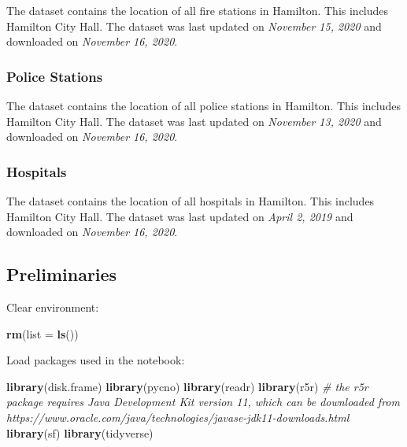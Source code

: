 \documentclass[
]{article}
\newenvironment{Shaded}{\begin{snugshade}}{\end{snugshade}}
\newcommand{\CommentTok}[1]{\textcolor[rgb]{0.56,0.35,0.01}{\textit{#1}}}
\newcommand{\DataTypeTok}[1]{\textcolor[rgb]{0.13,0.29,0.53}{#1}}
\newcommand{\KeywordTok}[1]{\textcolor[rgb]{0.13,0.29,0.53}{\textbf{#1}}}
\newcommand{\NormalTok}[1]{#1}
\begin{document}
The dataset contains the location of all fire stations in Hamilton. This
includes Hamilton City Hall. The dataset was last updated on
\emph{November 15, 2020} and downloaded on \emph{November 16, 2020}.

\hypertarget{police-stations}{%
\subsubsection{Police Stations}\label{police-stations}}

The dataset contains the location of all police stations in Hamilton.
This includes Hamilton City Hall. The dataset was last updated on
\emph{November 13, 2020} and downloaded on \emph{November 16, 2020}.

\hypertarget{hospitals}{%
\subsubsection{Hospitals}\label{hospitals}}

The dataset contains the location of all hospitals in Hamilton. This
includes Hamilton City Hall. The dataset was last updated on \emph{April
2, 2019} and downloaded on \emph{November 16, 2020}.

\hypertarget{preliminaries}{%
\subsection{Preliminaries}\label{preliminaries}}

Clear environment:

\begin{Shaded}
\begin{Highlighting}[]
\KeywordTok{rm}\NormalTok{(}\DataTypeTok{list =} \KeywordTok{ls}\NormalTok{())}
\end{Highlighting}
\end{Shaded}

Load packages used in the notebook:

\begin{Shaded}
\begin{Highlighting}[]
\KeywordTok{library}\NormalTok{(disk.frame)}
\KeywordTok{library}\NormalTok{(pycno)}
\KeywordTok{library}\NormalTok{(readr)}
\KeywordTok{library}\NormalTok{(r5r) }\CommentTok{# the r5r package requires Java Development Kit version 11, which can be downloaded from https://www.oracle.com/java/technologies/javase-jdk11-downloads.html}
\KeywordTok{library}\NormalTok{(sf)}
\KeywordTok{library}\NormalTok{(tidyverse)}
\end{Highlighting}
\end{Shaded}
\end{document}
